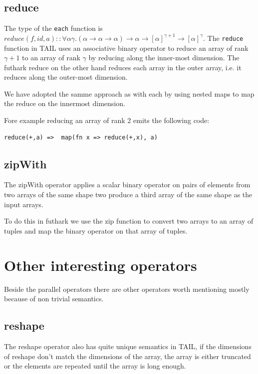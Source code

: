 \documentclass[11pt]{article}
\begin{document}
\subsection{reduce}
The type of the {\tt each} function is $reduce(f,id,a) :: \forall\alpha\gamma.(\alpha \to \alpha \to \alpha) \to \alpha \to [\alpha]^{\gamma+1} \to [\alpha]^\gamma$.
The {\tt reduce} function in TAIL uses an associative binary operator to reduce an array of rank $\gamma+1$ to an array of rank $\gamma$ by reducing along the inner-most dimension. The futhark reduce on the other hand reduces each array in the outer array, i.e. it reduces along the outer-most dimension. 

We have adopted the samme approach as with each by using nested maps to map the reduce on the innermost dimension.

Fore example reducing an array of rank 2 emits the following code:

\begin{lstlisting}[numbers=none,frame=none]
reduce(+,a)	=> 	map(fn x => reduce(+,x), a)
\end{lstlisting}

\subsection{zipWith}

The zipWith operator applies a scalar binary operator on pairs of elements from two arrays of the same shape two
produce a third array of the same shape as the input arrays.

To do this in futhark we use the zip function to convert two arrays to an array of tuples and map the binary operator on that array of tuples.

\section{Other interesting operators}

Beside the parallel operators there are other operators worth mentioning mostly because of non trivial semantics.  

\subsection{reshape}

The reshape operator also has quite unique semantics in TAIL, if the dimensions of reshape don't match the dimensions of the array, the
array is either truncated or the elements are repeated until the array is long enough.
\end{document}
